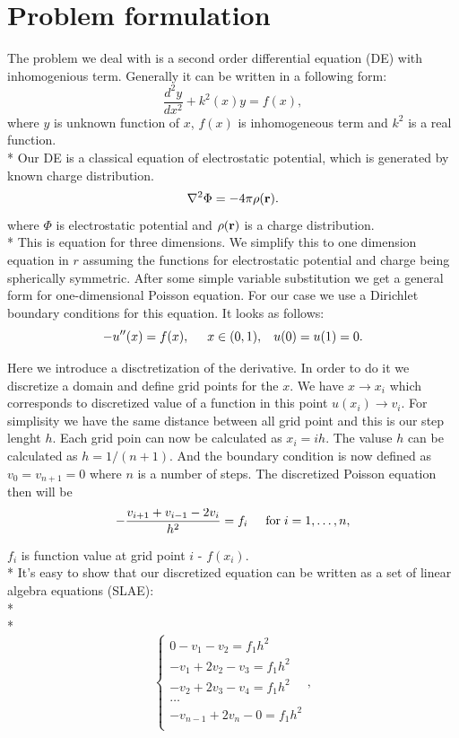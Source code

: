 \documentclass[10pt]{article}
\begin{document}
\section{Problem formulation}
The problem we deal with is a second order differential equation (DE) with inhomogenious term. Generally it can be written in a following form:
\[
\frac{d^2y}{dx^2}+k^2(x)y = f(x),
\]
where $y$ is unknown function of $x$, $f(x)$ is inhomogeneous term and $k^2$ is a real function.\\* 
Our DE is a classical equation of electrostatic potential, which is generated by known charge distribution. 
\[
\nabla^2 \Phi = -4\pi \rho ({\bf r}).
\]
where $\Phi$ is electrostatic potential and $\rho ({\bf r})$ is a charge distribution. \\* 
This is equation for three dimensions. We simplify this to one dimension equation in $r$ assuming the functions for electrostatic potential and charge  being spherically symmetric. After some simple variable substitution we get a general form for one-dimensional Poisson equation. For our case we use a Dirichlet boundary conditions for this equation. It looks as follows:
\begin{equation}\label{equ:one}
-u''(x) = f(x), \hspace{0.5cm} x\in(0,1), \hspace{0.3cm} u(0) = u(1) = 0.
\end{equation}

Here we introduce a disctretization of the derivative. In order to do it we discretize a domain and define grid points for the $ x $. We have $x\rightarrow x_{i}$ which corresponds to discretized value of a function in this point $u(x_{i})\rightarrow v_i$. For simplisity we have the same distance between all grid point and this is our step lenght $ h $. Each grid poin can now be calculated as $x_i=ih$. The valuse $ h $ can be calculated as $h=1/(n+1)$. And the boundary condition is now defined as $v_0 = v_{n+1} = 0$ where $ n $ is a number of steps. The discretized Poisson equation then will be
\[
   -\frac{v_{i+1}+v_{i-1}-2v_i}{h^2} = f_i  \hspace{0.5cm} \mathrm{for} \hspace{0.1cm} i=1,\dots, n,
\]

 $f_i$ is function value at grid point $i$ \-- $f(x_i)$. \\* 
 It's easy to show that our discretized equation can be written as a set of linear algebra equations (SLAE):
 \\* 
  \\* 
\begin{equation}
\begin{cases}
0 - v_{1}-v_{2} = f_1h^2 \\ -v_{1}+2v_{2}-v_{3} = f_1h^2  \\ 
-v_{2}+2v_{3}-v_{4} = f_1h^2  \\ \dots  \\ -v_{n-1}+2v_{n}-0= f_1h^2 \\
\end{cases},
\end{equation}
\end{document}
